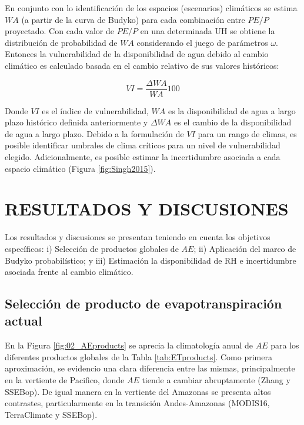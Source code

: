 \documentclass[12pt]{article}
\begin{document}
En conjunto con lo identificación de los espacios (escenarios) climáticos se estima $WA$ (a partir de la curva de Budyko) para cada combinación entre $PE/P$ proyectado. Con cada valor de $PE/P$ en una determinada UH se obtiene la distribución de probabilidad de $WA$ considerando el juego de parámetros $\omega$. Entonces la vulnerabilidad de la disponibilidad de agua debido al cambio climático es calculado basada en el cambio relativo de sus valores históricos:

\begin{equation}
VI = \frac{\Delta WA}{WA}100
\end{equation}

Donde $VI$ es el índice de vulnerabilidad, $WA$ es la disponibilidad de agua a largo plazo histórico definida anteriormente y $\Delta WA$ es el cambio de la disponibilidad de agua a largo plazo. Debido a la formulación de $VI$ para un rango de climas, es posible identificar umbrales de clima críticos para un nivel de vulnerabilidad elegido. Adicionalmente, es posible estimar la incertidumbre asociada a cada espacio climático (Figura \ref{fig:Singh2015}).

\clearpage
\vspace*{0.5mm}
\section{RESULTADOS Y DISCUSIONES}

Los resultados y discusiones se presentan teniendo en cuenta los objetivos específicos: i) Selección de productos globales de $AE$; ii) Aplicación del marco de Budyko probabilístico; y iii) Estimación la disponibilidad de RH e incertidumbre asociada frente al cambio climático.

\subsection{Selección de producto de evapotranspiración actual}

En la Figura \ref{fig:02_AEproducts} se aprecia la climatología anual de $AE$ para los diferentes productos globales de la Tabla \ref{tab:ETproducts}. Como primera aproximación, se evidencio una clara diferencia entre las mismas, principalmente en la vertiente de Pacifico, donde $AE$ tiende a cambiar abruptamente (Zhang y SSEBop). De igual manera en la vertiente del Amazonas se presenta altos contrastes, particularmente en la transición Andes-Amazonas (MODIS16, TerraClimate y SSEBop). 
\end{document}
